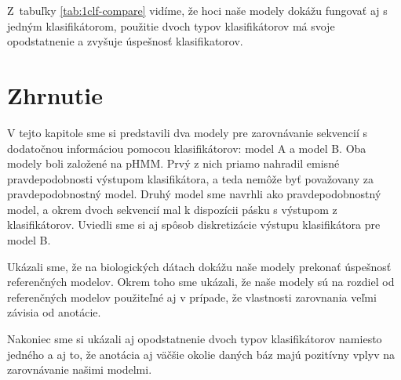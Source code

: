 Z~tabuľky \ref{tab:1clf-compare} vidíme, že hoci naše modely dokážu fungovať aj s jedným klasifikátorom, použitie dvoch typov klasifikátorov má svoje opodstatnenie a zvyšuje úspešnosť klasifikatorov.

\section{Zhrnutie}

V tejto kapitole sme si predstavili dva modely pre zarovnávanie sekvencií s dodatočnou informáciou pomocou klasifikátorov: model A a model B.
Oba modely boli založené na pHMM. Prvý z nich priamo nahradil emisné pravdepodobnosti výstupom klasifikátora, a teda nemôže byť považovany za pravdepodobnostný model.
Druhý model sme navrhli ako pravdepodobnostný model, a okrem dvoch sekvencií mal k dispozícii pásku s výstupom z klasifikátorov. Uviedli sme si aj spôsob diskretizácie výstupu klasifikátora pre model B.

Ukázali sme, že na biologických dátach dokážu naše modely prekonať úspešnosť referenčných modelov. Okrem toho sme ukázali, že naše modely sú na rozdiel od referenčných modelov použiteľné aj v prípade, že vlastnosti zarovnania veľmi závisia od anotácie.

Nakoniec sme si ukázali aj opodstatnenie dvoch typov klasifikátorov namiesto jedného a aj to, že anotácia aj väčšie okolie daných báz majú pozitívny vplyv na zarovnávanie našimi modelmi.
